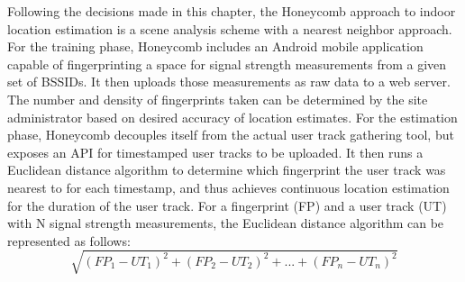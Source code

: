 Following the decisions made in this chapter, the Honeycomb approach to indoor location estimation is a scene analysis scheme with a nearest neighbor approach. For the training phase, Honeycomb includes an Android mobile application capable of fingerprinting a space for signal strength measurements from a given set of BSSIDs. It then uploads those measurements as raw data to a web server. The number and density of fingerprints taken can be determined by the site administrator based on desired accuracy of location estimates. For the estimation phase, Honeycomb decouples itself from the actual user track gathering tool, but exposes an API for timestamped user tracks to be uploaded. It then runs a Euclidean distance algorithm to determine which fingerprint the user track was nearest to for each timestamp, and thus achieves continuous location estimation for the duration of the user track. For a fingerprint (FP) and a user track (UT) with N signal strength measurements, the Euclidean distance algorithm can be represented as follows: \ \[ \sqrt{(FP_{1} - UT_{1})^2 + (FP_{2} - UT_{2})^2 + ... + (FP_{n} - UT_{n})^2} \]

